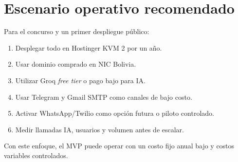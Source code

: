 \section{Escenario operativo recomendado}

Para el concurso y un primer despliegue p\'ublico:

\begin{enumerate}[nosep]
    \item Desplegar todo en Hostinger KVM 2 por un a\~no.
    \item Usar dominio comprado en NIC Bolivia.
    \item Utilizar Groq \textit{free tier} o pago bajo para IA.
    \item Usar Telegram y Gmail SMTP como canales de bajo costo.
    \item Activar WhatsApp/Twilio como opci\'on futura o piloto controlado.
    \item Medir llamadas IA, usuarios y volumen antes de escalar.
\end{enumerate}

Con este enfoque, el MVP puede operar con un costo fijo anual bajo y costos variables controlados.
